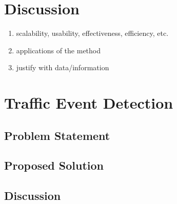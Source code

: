 \documentclass[a4paper,portrait,12pt]{article}
\begin{document}
\section{Discussion}
\begin{enumerate}
    \item scalability, usability, effectiveness, efficiency, etc.
    \item applications of the method
    \item justify with data/information
\end{enumerate}

\section{Traffic Event Detection}
\subsection{Problem Statement}
\subsection{Proposed Solution}
\subsection{Discussion}

\newpage
\nocite{*}


\end{document}
